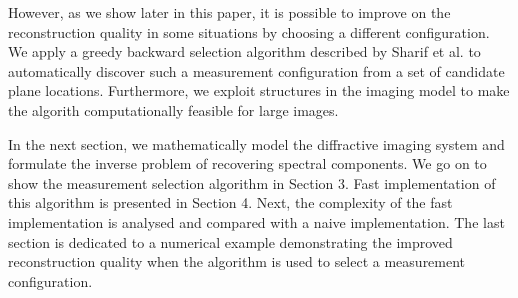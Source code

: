 \documentclass{article}
\begin{document}


However, as we show later in this paper, it is possible to improve on the
reconstruction quality in some situations by choosing a different configuration.
We apply a greedy backward selection algorithm described by
Sharif et al. \cite{sharif} to automatically discover such a measurement
configuration from a set of candidate plane locations. Furthermore, we exploit
structures in the imaging model to make the algorith computationally feasible
for large images.

In the next section, we mathematically model the diffractive imaging system and
formulate the inverse problem of recovering spectral components. We go on to
show the measurement selection algorithm in Section 3. Fast implementation of
this algorithm is presented in Section 4. Next, the complexity of the fast
implementation is analysed and compared with a naive implementation. The last
section is dedicated to a numerical example demonstrating the improved
reconstruction quality when the algorithm is used to select a measurement
configuration.
\end{document}

